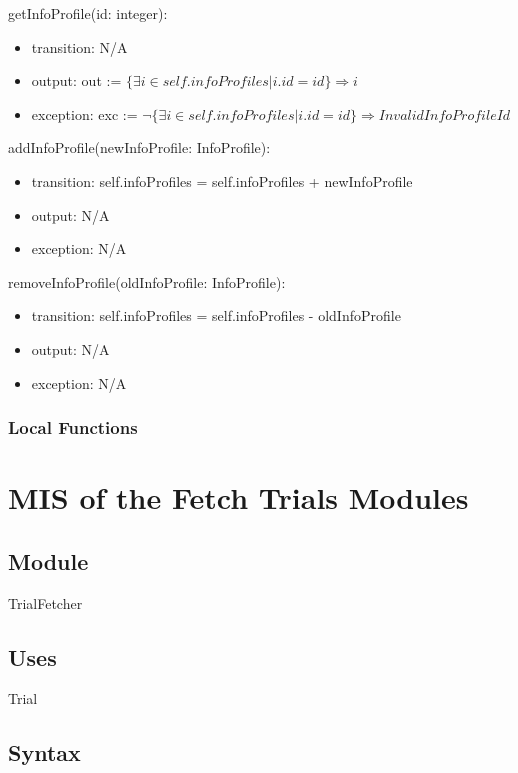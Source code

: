 \documentclass[12pt, titlepage]{article}
\begin{document}
\noindent getInfoProfile(id: integer):
\begin{itemize}
\item transition: N/A
\item output: out := $\{\exists i \in self.infoProfiles | i.id = id\} \Rightarrow i$
\item exception: exc := $\neg\{\exists i \in self.infoProfiles | i.id = id\} \Rightarrow InvalidInfoProfileId$
\end{itemize}

\noindent addInfoProfile(newInfoProfile: InfoProfile):
\begin{itemize}
\item transition: self.infoProfiles = self.infoProfiles + newInfoProfile
\item output: N/A
\item exception: N/A
\end{itemize}

\noindent removeInfoProfile(oldInfoProfile: InfoProfile):
\begin{itemize}
\item transition: self.infoProfiles = self.infoProfiles - oldInfoProfile
\item output: N/A
\item exception: N/A
\end{itemize}


\subsubsection{Local Functions}


\section{MIS of the Fetch Trials Modules} \label{User}

\subsection{Module}

TrialFetcher

\subsection{Uses}

Trial

\subsection{Syntax}
\end{document}
